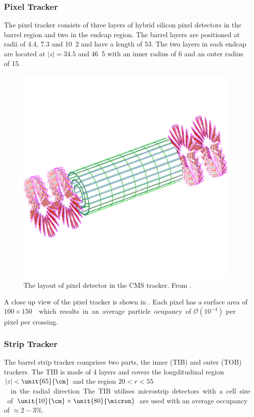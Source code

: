 \subsubsection{Pixel Tracker}
The pixel tracker consists of three layers of hybrid silicon pixel detectors in
the barrel region and two in the endcap region. 
The barrel layers are positioned at radii of 4.4, 7.3 and \unit{10.2}{\cm} and have
a length of \unit{53}{\cm}. The two layers in each endcap are located at
$|z|=34.5$ and \unit{46.5}{\cm} with an inner radius of \unit{6}{\cm} and an
outer radius of \unit{15}{\cm}.

\begin{figure}[htbp]
  \centering
  \includegraphics[width=0.98\textwidth]{pixel}
  \caption{The layout of pixel detector in the CMS tracker. From \cite{tdr}.}
  \label{fig:pixel}
\end{figure}

A close up view of the pixel tracker is shown in .  
Each pixel has a surface area of \unit{$100\times150$}{\micron} which results in
an average particle ocupancy of $\mathcal{O}(10^{-4})$ per pixel per crossing.

\subsubsection{Strip Tracker}
The barrel strip tracker comprises two parts, the inner (TIB) and outer (TOB)
trackers.  The TIB is made of 4 layers and covers the longditudinal region $|z|
< \unit{65}{\cm}$ and the region \unit{$20<r<55$}{\cm} in the radial direction.
The TIB utilises microstrip detectors with a cell size of
$\unit{10}{\cm}\times\unit{80}{\micron}$ are used with an average occupancy of
$\approx\unit{2-3}{\%}$.


